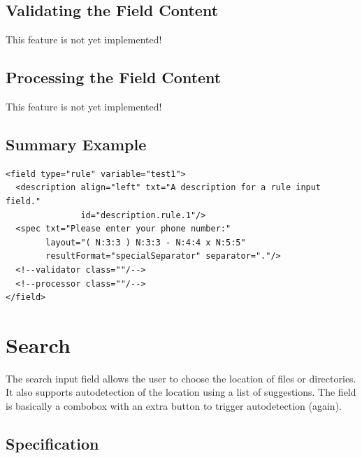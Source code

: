 \subsection{Validating the Field Content}

This feature is not yet implemented!\\

\subsection{Processing the Field Content}

This feature is not yet implemented!\\

\subsection{Summary Example}

\footnotesize
\begin{verbatim}
<field type="rule" variable="test1">
  <description align="left" txt="A description for a rule input field."
               id="description.rule.1"/>
  <spec txt="Please enter your phone number:" 
        layout="( N:3:3 ) N:3:3 - N:4:4 x N:5:5" 
        resultFormat="specialSeparator" separator="."/>
  <!--validator class=""/-->
  <!--processor class=""/-->
</field>
\end{verbatim}
\normalsize

\section{Search}

The search input field allows the user to choose the location of files or
directories. It also supports autodetection of the location using a list of 
suggestions. The field is basically a combobox with an extra button to
trigger autodetection (again).

\begin{center}
\end{center}

\subsection{Specification}

